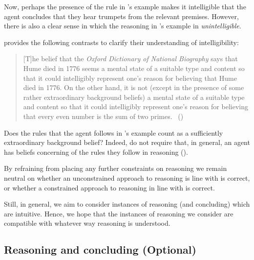 \begin{note}[No constraints]
  Now, perhaps the presence of the rule in \citeauthor{Broome:2013aa}'s example makes it intelligible that the agent concludes that they hear trumpets from the relevant premises.
  However, there is also a clear sense in which the reasoning in \citeauthor{Broome:2013aa}'s example in \emph{unintelligible}.

  \citeauthor{Wedgwood:2006ui} provides the following contrasts to clarify their understanding of intelligibility:

  \begin{quote}
    [T]he belief that the \emph{Oxford Dictionary of National Biography} says that Hume died in 1776 seems a mental state of a suitable type and content so that it could intelligibly represent one's reason for believing that Hume died in 1776.
    On the other hand, it is not (except in the presence of some rather extraordinary background beliefs) a mental state of a suitable type and content so that it could intelligibly represent one's reason for believing that every even number is the sum of two primes.%
    \mbox{ }\hfill\mbox{(\citeyear[662]{Wedgwood:2006ui})}
  \end{quote}

  Does the rules that the agent follows in \citeauthor{Broome:2013aa}'s example count as a sufficiently extraordinary background belief?
  Indeed, \citeauthor{Broome:2013aa} do not require that, in general, an agent has beliefs concerning of the rules they follow in reasoning (\citeyear[Cf.][\S13.2]{Broome:2013aa}).
\end{note}

\begin{note}
  By refraining from placing any further constraints on reasoning we remain neutral on whether an unconstrained approach to reasoning is line with \citeauthor{Broome:2013aa} is correct, or whether a constrained approach to reasoning in line with \citeauthor{Wedgwood:2006ui} is correct.

  Still, in general, we aim to consider instances of reasoning (and concluding) which are intuitive.
  Hence, we hope that the instances of reasoning we consider are compatible with whatever way reasoning is understood.
\end{note}

\subsection[Reasoning-to vs.\ concluding]{Reasoning and concluding \hfill (Optional)}


